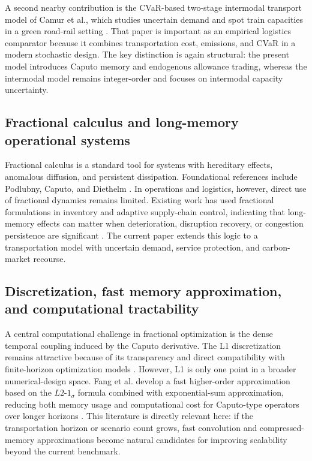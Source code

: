 A second nearby contribution is the CVaR-based two-stage intermodal transport model of Camur et al., which studies uncertain demand and spot train capacities in a green road-rail setting \cite{gbadegoye2025intermodal}. That paper is important as an empirical logistics comparator because it combines transportation cost, emissions, and CVaR in a modern stochastic design. The key distinction is again structural: the present model introduces Caputo memory and endogenous allowance trading, whereas the intermodal model remains integer-order and focuses on intermodal capacity uncertainty.

\subsection{Fractional calculus and long-memory operational systems}
Fractional calculus is a standard tool for systems with hereditary effects, anomalous diffusion, and persistent dissipation. Foundational references include Podlubny, Caputo, and Diethelm \cite{podlubny1999,caputo1967,diethelm2010}. In operations and logistics, however, direct use of fractional dynamics remains limited. Existing work has used fractional formulations in inventory and adaptive supply-chain control, indicating that long-memory effects can matter when deterioration, disruption recovery, or congestion persistence are significant \cite{cuong2023,haque2026}. The current paper extends this logic to a transportation model with uncertain demand, service protection, and carbon-market recourse.

\subsection{Discretization, fast memory approximation, and computational tractability}
A central computational challenge in fractional optimization is the dense temporal coupling induced by the Caputo derivative. The L1 discretization remains attractive because of its transparency and direct compatibility with finite-horizon optimization models \cite{lin2007}. However, L1 is only one point in a broader numerical-design space. Fang et al. develop a fast higher-order approximation based on the $L2$-$1_{\sigma}$ formula combined with exponential-sum approximation, reducing both memory usage and computational cost for Caputo-type operators over longer horizons \cite{zhang2022fast}. This literature is directly relevant here: if the transportation horizon or scenario count grows, fast convolution and compressed-memory approximations become natural candidates for improving scalability beyond the current benchmark.

